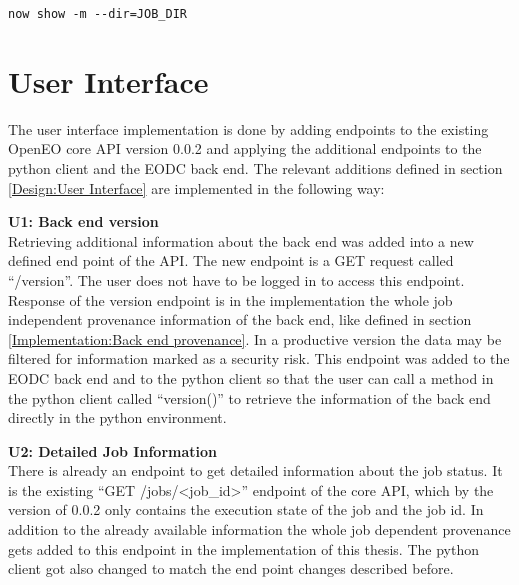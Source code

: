 \documentclass[draft,final]{vutinfth} %
\begin{document}
\begin{lstlisting}[frame=single]
now show -m --dir=JOB_DIR
\end{lstlisting}

\section{User Interface}\label{Implementation:User Interface}
The user interface implementation is done by adding endpoints to the existing OpenEO core API version 0.0.2 and applying the additional endpoints to the python client and the EODC back end. The relevant additions defined in section \ref{Design:User Interface} are implemented in the following way:

\textbf{U1: Back end version} \\
Retrieving additional information about the back end was added into a new defined end point of the API. The new endpoint is a GET request called “/version”. The user does not have to be logged in to access this endpoint. Response of the version endpoint is in the implementation the whole job independent provenance information of the back end, like defined in section \ref{Implementation:Back end provenance}. In a productive version the data may be filtered for information marked as a security risk. This endpoint was added to the EODC back end and to the python client so that the user can call a method in the python client called “version()” to retrieve the information of the back end directly in the python environment. 

\textbf{U2: Detailed Job Information} \\
There is already an endpoint to get detailed information about the job status. It is the existing “GET /jobs/<job\_id>” endpoint of the core API, which by the version of 0.0.2 only contains the execution state of the job and the job id. In addition to the already available information the whole job dependent provenance gets added to this endpoint in the implementation of this thesis. The python client got also changed to match the end point changes described before.  
\end{document}
